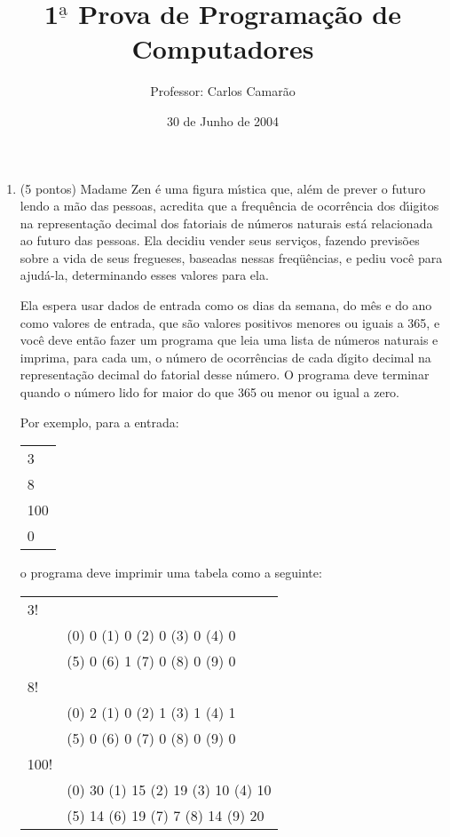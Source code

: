 \documentclass{article}
\title{1$^{\underline{\mbox{a}}}$ Prova de Programa\c{c}\~ao de Computadores}
\author{Professor: Carlos Camar\~ao}
\date{30 de Junho de 2004}
\begin{document}
\maketitle

\begin{enumerate}

\item (5 pontos) Madame Zen \'e uma figura m\'{\i}stica que, al\'em de
prever o futuro lendo a m\~ao das pessoas, acredita que a frequ\^encia
de ocorr\^encia dos d\'{\i}igitos na representa\c{c}\~ao decimal dos
fatoriais de n\'umeros naturais est\'a relacionada ao futuro das
pessoas. Ela decidiu vender seus servi\c{c}os, fazendo previs\~oes
sobre a vida de seus fregueses, baseadas nessas freq\"u\^encias, e
pediu voc\^e para ajud\'a-la, determinando esses valores para ela.

Ela espera usar dados de entrada como os dias da semana, do m\^es e do
ano como valores de entrada, que s\~ao valores positivos menores ou
iguais a 365, e voc\^e deve ent\~ao fazer um programa que leia uma
lista de n\'umeros naturais e imprima, para cada um, o n\'umero de
ocorr\^encias de cada d\'{\i}gito decimal na representa\c{c}\~ao
decimal do fatorial desse n\'umero. O programa deve terminar quando o
n\'umero lido for maior do que 365 ou menor ou igual a zero.

Por exemplo, para a entrada:

\begin{tabular}{l}
3\\
8\\
100\\
0
\end{tabular}

o programa deve imprimir uma tabela como a seguinte:

\begin{tabular}{ll}
3!   & \\
     & (0)    0    (1)    0    (2)    0    (3)    0    (4)    0\\
     & (5)    0    (6)    1    (7)    0    (8)    0    (9)    0\\
8!   & \\
     & (0)    2    (1)    0    (2)    1    (3)    1    (4)    1\\
     & (5)    0    (6)    0    (7)    0    (8)    0    (9)    0\\
100! & \\
     & (0)   30    (1)   15    (2)   19    (3)   10    (4)   10\\
     & (5)   14    (6)   19    (7)    7    (8)   14    (9)   20
\end{tabular}


\end{enumerate}
\end{document}
